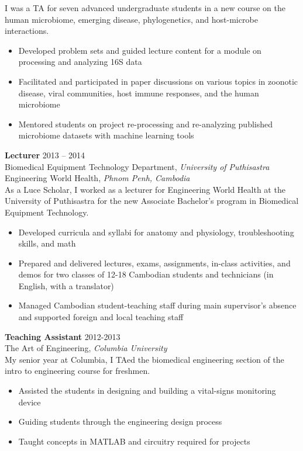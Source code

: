 \documentclass[10pt]{article}
\newenvironment{innerlist}[1][\enskip\textbullet]%
        {\begin{itemize}[#1,leftmargin=*,parsep=0pt,itemsep=0pt,topsep=0pt,partopsep=0pt]}
        {\end{itemize}}
\begin{document}
I was a TA for seven advanced undergraduate students in a new course on the human microbiome, emerging disease, phylogenetics, and host-microbe interactions. \\

\begin{innerlist}
\item{Developed problem sets and guided lecture content for a module on processing and analyzing 16S data}
\item{Facilitated and participated in paper discussions on various topics in zoonotic disease, viral communities, host immune responses, and the human microbiome}
\item{Mentored students on project re-processing and re-analyzing published microbiome datasets with machine learning tools}
\end{innerlist}

\vspace{.15in}
\textbf{Lecturer} \hfill {2013 -- 2014} \\
Biomedical Equipment Technology Department, \textit{University of Puthisastra} \\
Engineering World Health, \textit{Phnom Penh, Cambodia} \\

As a Luce Scholar, I worked as a lecturer for Engineering World Health at the University of Puthisastra for the new Associate Bachelor’s program in Biomedical Equipment Technology. \\

\begin{innerlist}
\item{Developed curricula and syllabi for anatomy and physiology, troubleshooting skills, and math}
\item{Prepared and delivered lectures, exams, assignments, in-class activities, and demos for two classes of 12-18 Cambodian students and technicians (in English, with a translator)}
\item{Managed Cambodian student-teaching staff during main supervisor’s absence and supported foreign and local teaching staff}
\end{innerlist}

\vspace{.15in}
\textbf{Teaching Assistant} \hfill {2012-2013} \\
The Art of Engineering, \textit{Columbia University} \\

My senior year at Columbia, I TAed the biomedical engineering section of the intro to engineering course for freshmen. \\

\begin{innerlist}
\item{Assisted the students in designing and building a vital-signs monitoring device}
\item{Guiding students through the engineering design process}
\item{Taught concepts in MATLAB and circuitry required for projects}
\end{innerlist}
\end{document}

